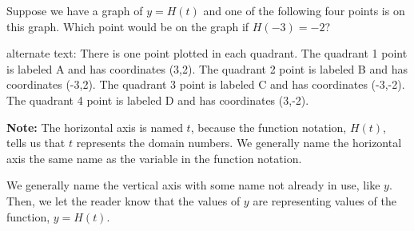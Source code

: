\documentclass{ximera}
\begin{document}
\begin{question} 


Suppose we have a graph of $y=H(t)$ and one of the following four points is on this graph. Which point would be on the graph if $H(-3) = -2$?

\begin{image}
\end{image}



\textcolor{gray!90}{alternate text: There is one point plotted in each quadrant. The quadrant 1 point is labeled A and has coordinates (3,2). The quadrant 2 point is labeled B and has coordinates (-3,2). The quadrant 3 point is labeled C and has coordinates (-3,-2). The quadrant 4 point is labeled D and has coordinates (3,-2).}





\begin{multipleChoice}
\end{multipleChoice}


\textbf{Note: } The horizontal axis is named $t$, because the function notation, $H(t)$, tells us that $t$ represents the domain numbers.  We generally name the horizontal axis the same name as the variable in the function notation.


We generally name the vertical axis with some name not already in use, like $y$.  Then, we let the reader know that the values of $y$ are representing values of the function, $y=H(t)$.
\end{question}
\end{document}
